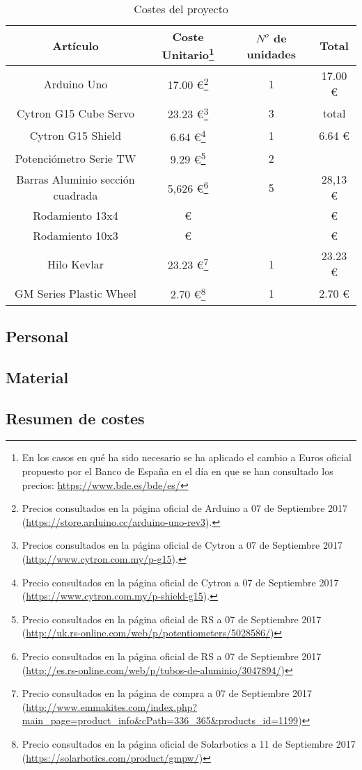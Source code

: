     \begin{table}[H]
    \caption{Costes del proyecto}
    \label{tab:presupuesto}
    \begin{center}
    \begin{minipage}{\textwidth}
    \begin{tabular}{ |c|c|c|c| }
    \hline
    Artículo & Coste Unitario\footnote{En los casos en qué ha sido necesario se ha aplicado el cambio a Euros oficial propuesto por el Banco de España en el día en que se han consultado los precios: \url{https://www.bde.es/bde/es/}} & $N^o$ de unidades & Total\\
    \hline
    \hline
    Arduino Uno & 17.00 \euro\footnote{Precios consultados en la página oficial de Arduino a 07 de Septiembre 2017 (\url{https://store.arduino.cc/arduino-uno-rev3}).} & 1 & 17.00 \euro\\
    Cytron G15 Cube Servo & 23.23 \euro\footnote{Precios consultados en la página oficial de Cytron a 07 de Septiembre 2017 (\url{http://www.cytron.com.my/p-g15}).} & 3 & total\\
    Cytron G15 Shield & 6.64 \euro\footnote{Precio consultados en la página oficial de Cytron a 07 de Septiembre 2017 (\url{https://www.cytron.com.my/p-shield-g15}).} & 1 & 6.64 \euro\\
    \hline
    \hline
    Potenciómetro Serie TW & 9.29 \euro\footnote{Precio consultados en la página oficial de RS a 07 de Septiembre 2017 (\url{http://uk.rs-online.com/web/p/potentiometers/5028586/})} & 2 & \\
    \hline
    \hline
    Barras Aluminio sección cuadrada & 5,626 \euro\footnote{Precio consultados en la página oficial de RS a 07 de Septiembre 2017 (\url{http://es.rs-online.com/web/p/tubos-de-aluminio/3047894/})} & 5 & 28,13 \euro \\
    Rodamiento 13x4 & \euro & & \euro \\
    Rodamiento 10x3 & \euro & & \euro \\
    Hilo Kevlar & 23.23 \euro\footnote{Precio consultados en la página de compra a 07 de Septiembre 2017 (\url{http://www.emmakites.com/index.php?main_page=product_info&cPath=336_365&products_id=1199})} & 1 & 23.23 \euro \\
    GM Series Plastic Wheel & 2.70 \euro\footnote{Precio consultados en la página oficial de Solarbotics a 11 de Septiembre 2017 (\url{https://solarbotics.com/product/gmpw/})} & 1 & 2.70 \euro \\
    \hline
    \end{tabular}
    \end{minipage}
    \end{center}
    \end{table}

\subsection{Personal}

\subsection{Material}

\subsection{Resumen de costes}